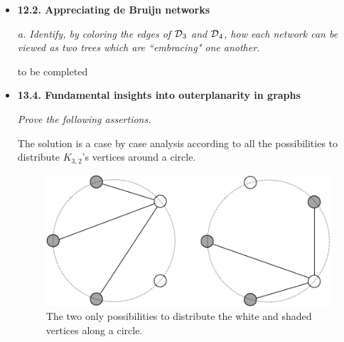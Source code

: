 \begin{itemize}
\item
{\bf 12.2. Appreciating de Bruijn networks}
\smallskip


\noindent
{\em a. Identify, by coloring the edges of $\mbox{$\cal D$}_3$ and $\mbox{$\cal D$}_4$, how each network can be viewed as two trees which are ``embracing" one another.}

\smallskip

to be completed


  \medskip\item 
{\bf 13.4. Fundamental insights into outerplanarity in graphs}
\smallskip

{\em Prove the following assertions.}


\smallskip


The solution is a case by case analysis according to all the possibilities to distribute  $K_{3,2}$'s vertices around a circle.
\begin{figure}[h]
\begin{center}
        \includegraphics[scale=0.4]{FiguresGraph/outerplanarK3,2}
        \caption{The two only possibilities to distribute the white and shaded vertices along a circle.}
\end{center}
\end{figure}


\end{itemize}



